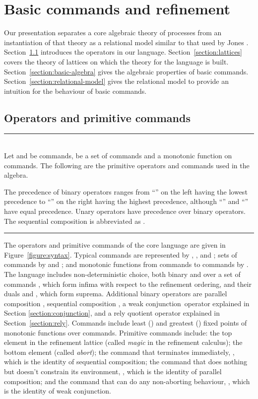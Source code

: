 \documentclass[fleqn]{fac}
\newcommand{\figurerule}{\rule{\textwidth}{0.5pt}}
\newcommand{\strictconjunction}{weak conjunction}
\begin{document}
\section{Basic commands and refinement}\label{section:basics}

Our presentation separates a core algebraic theory of processes
from an instantiation of that theory as a relational model 
similar to that used by Jones \cite{CoJo07}.
Section~\ref{section:syntax} introduces the operators in our language.
Section~\ref{section:lattices} covers the theory of lattices on which the theory for the language is built.
Section~\ref{section:basic-algebra} gives the algebraic properties of basic commands.
Section~\ref{section:relational-model} gives the relational model 
to provide an intuition for the behaviour of basic commands.


\subsection{Operators and primitive commands}\label{section:syntax}

\begin{figure*}
\figurerule\\
Let  and  be commands,  be a set of commands and  a monotonic function on commands.
The following are the primitive operators and commands used in the algebra.

The precedence of binary operators ranges 
from ``'' on the left having the lowest precedence
to ``'' on the right having the highest precedence,
although ``'' and ``'' have equal precedence.
Unary operators have precedence over binary operators.
The sequential composition  is abbreviated as .

\figurerule
\caption{Operators and primitive commands}\label{figure:syntax}
\end{figure*}


The operators and primitive commands of the core language are given in Figure~\ref{figure:syntax}.
Typical 
commands are represented by , ,  and ;
sets of commands by  and ;
and
monotonic functions from commands to commands by .
The language includes non-deterministic choice, 
both binary  and over a set of commands , 
which form infima with respect to the refinement ordering,
and their duals  and ,
which form suprema.
Additional binary operators are 
parallel composition , 
sequential composition ,
a \strictconjunction\ operator  explained in Section \ref{section:conjunction},
and
a rely quotient operator  explained in Section~\ref{section:rely}.
Commands include least () and greatest () fixed points of monotonic functions over commands.
Primitive commands include:
the top element in the refinement lattice  
(called \emph{magic} in the refinement calculus);
the bottom element  
(called \emph{abort});
the command that terminates immediately, ,
which is the identity of sequential composition;
the command that does nothing but doesn't constrain its environment, ,
which is the identity of parallel composition;
and
the command that can do any non-aborting behaviour, ,
which is the identity of \strictconjunction.
\end{document}
